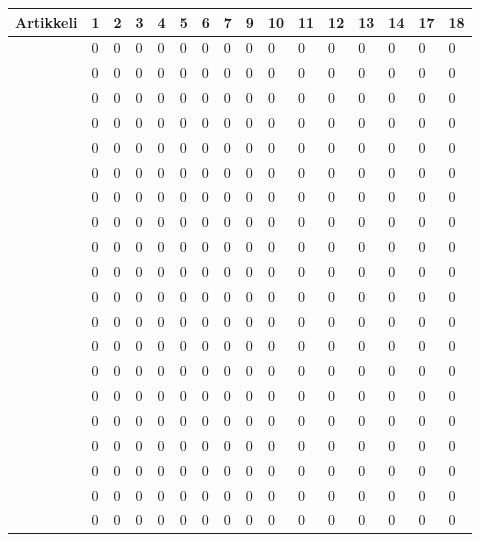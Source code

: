 \documentclass[utf8]{gradu3}
\begin{document}
\begin{table}[h]
    \scriptsize
    \begin{tabular}{llllllllllllllll}

\toprule
\textbf{Artikkeli} & \textbf{1} & \textbf{2} & \textbf{3} & \textbf{4} & \textbf{5} & \textbf{6} & \textbf{7} & \textbf{9} & \textbf{10} & \textbf{11} & \textbf{12} & \textbf{13} & \textbf{14} & \textbf{17} & \textbf{18} \\

\midrule
\textcite{rodeghero-ym-2021} & 0 & 0 & 0 & 0 & 0 & 0 & 0 & 0 & 0 & 0 & 0 & 0 & 0 & 0 & 0 \\
\midrule
\textcite{azanza-ym-2021} & 0 & 0 & 0 & 0 & 0 & 0 & 0 & 0 & 0 & 0 & 0 & 0 & 0 & 0 & 0 \\
\midrule
\textcite{ju-ym-2021} & 0 & 0 & 0 & 0 & 0 & 0 & 0 & 0 & 0 & 0 & 0 & 0 & 0 & 0 & 0 \\
\midrule
\textcite{britto-ym-2020} & 0 & 0 & 0 & 0 & 0 & 0 & 0 & 0 & 0 & 0 & 0 & 0 & 0 & 0 & 0 \\
\midrule
\textcite{yates-ym-2020} & 0 & 0 & 0 & 0 & 0 & 0 & 0 & 0 & 0 & 0 & 0 & 0 & 0 & 0 & 0 \\
\midrule
\textcite{moe-ym-2020} & 0 & 0 & 0 & 0 & 0 & 0 & 0 & 0 & 0 & 0 & 0 & 0 & 0 & 0 & 0 \\
\midrule
\textcite{kumar-wallace-2019} & 0 & 0 & 0 & 0 & 0 & 0 & 0 & 0 & 0 & 0 & 0 & 0 & 0 & 0 & 0 \\
\midrule
\textcite{viviani-murphy-2019} & 0 & 0 & 0 & 0 & 0 & 0 & 0 & 0 & 0 & 0 & 0 & 0 & 0 & 0 & 0 \\
\midrule
\textcite{buchan-ym-2019} & 0 & 0 & 0 & 0 & 0 & 0 & 0 & 0 & 0 & 0 & 0 & 0 & 0 & 0 & 0 \\
\midrule
\textcite{tuzun-ym-2018} & 0 & 0 & 0 & 0 & 0 & 0 & 0 & 0 & 0 & 0 & 0 & 0 & 0 & 0 & 0 \\
\midrule
\textcite{matturro-ym-2017} & 0 & 0 & 0 & 0 & 0 & 0 & 0 & 0 & 0 & 0 & 0 & 0 & 0 & 0 & 0 \\
\midrule
\textcite{britto-ym-2017} & 0 & 0 & 0 & 0 & 0 & 0 & 0 & 0 & 0 & 0 & 0 & 0 & 0 & 0 & 0 \\
\midrule
\textcite{pham-ym-2017} & 0 & 0 & 0 & 0 & 0 & 0 & 0 & 0 & 0 & 0 & 0 & 0 & 0 & 0 & 0 \\
\midrule
\textcite{kumar-ym-2016} & 0 & 0 & 0 & 0 & 0 & 0 & 0 & 0 & 0 & 0 & 0 & 0 & 0 & 0 & 0 \\
\midrule
\textcite{shannon-pool-2016} & 0 & 0 & 0 & 0 & 0 & 0 & 0 & 0 & 0 & 0 & 0 & 0 & 0 & 0 & 0 \\
\midrule
\textcite{viana-ym-2014} & 0 & 0 & 0 & 0 & 0 & 0 & 0 & 0 & 0 & 0 & 0 & 0 & 0 & 0 & 0 \\
\midrule
\textcite{hemphill-begel-2011} & 0 & 0 & 0 & 0 & 0 & 0 & 0 & 0 & 0 & 0 & 0 & 0 & 0 & 0 & 0 \\
\midrule
\textcite{kulkarni-ym-2010} & 0 & 0 & 0 & 0 & 0 & 0 & 0 & 0 & 0 & 0 & 0 & 0 & 0 & 0 & 0 \\
\midrule
\textcite{johnson-senges-2010} & 0 & 0 & 0 & 0 & 0 & 0 & 0 & 0 & 0 & 0 & 0 & 0 & 0 & 0 & 0 \\
\midrule
\textcite{bjornson-dingsøyr-2005} & 0 & 0 & 0 & 0 & 0 & 0 & 0 & 0 & 0 & 0 & 0 & 0 & 0 & 0 & 0 \\
\bottomrule


\end{tabular}
\end{table}
\end{document}
